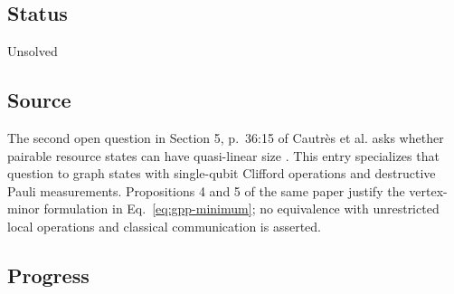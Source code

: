 \subsection*{Status}

Unsolved

\subsection*{Source}

The second open question in Section 5, p.~36:15 of Cautrès et al. asks whether pairable resource states can have quasi-linear size . This entry specializes that question to graph states with single-qubit Clifford operations and destructive Pauli measurements. Propositions 4 and 5 of the same paper justify the vertex-minor formulation in Eq.~\eqref{eq:gpp-minimum}; no equivalence with unrestricted local operations and classical communication is asserted.

\subsection*{Progress}

